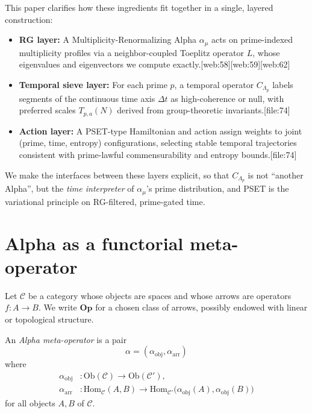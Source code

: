 \documentclass[11pt]{article}
\begin{document}
This paper clarifies how these ingredients fit together in a single, layered construction:
\begin{itemize}
    \item \textbf{RG layer:} A Multiplicity-Renormalizing Alpha $\alpha_\mu$ acts on prime-indexed multiplicity profiles via a neighbor-coupled Toeplitz operator $L$, whose eigenvalues and eigenvectors we compute exactly.[web:58][web:59][web:62]
    \item \textbf{Temporal sieve layer:} For each prime $p$, a temporal operator $C_{\Lambda_p}$ labels segments of the continuous time axis $\Delta t$ as high-coherence or null, with preferred scales $T_{p,a}(N)$ derived from group-theoretic invariants.[file:74]
    \item \textbf{Action layer:} A PSET-type Hamiltonian and action assign weights to joint (prime, time, entropy) configurations, selecting stable temporal trajectories consistent with prime-lawful commensurability and entropy bounds.[file:74]
\end{itemize}

We make the interfaces between these layers explicit, so that $C_{\Lambda_p}$ is not ``another Alpha'', but the \emph{time interpreter} of $\alpha_\mu$'s prime distribution, and PSET is the variational principle on RG-filtered, prime-gated time.

\section{Alpha as a functorial meta-operator}

Let $\mathcal{C}$ be a category whose objects are spaces and whose arrows are operators $f : A \to B$.
We write $\mathbf{Op}$ for a chosen class of arrows, possibly endowed with linear or topological structure.

\begin{definition}
An \emph{Alpha meta-operator} is a pair
\[
    \alpha = (\alpha_{\mathrm{obj}},\alpha_{\mathrm{arr}})
\]
where
\begin{align*}
    \alpha_{\mathrm{obj}} &: \mathrm{Ob}(\mathcal{C}) \to \mathrm{Ob}(\mathcal{C}'), \\
    \alpha_{\mathrm{arr}} &: \mathrm{Hom}_{\mathcal{C}}(A,B) \to \mathrm{Hom}_{\mathcal{C}'}\big(\alpha_{\mathrm{obj}}(A),\alpha_{\mathrm{obj}}(B)\big)
\end{align*}
for all objects $A,B$ of $\mathcal{C}$.
\end{definition}
\end{document}

